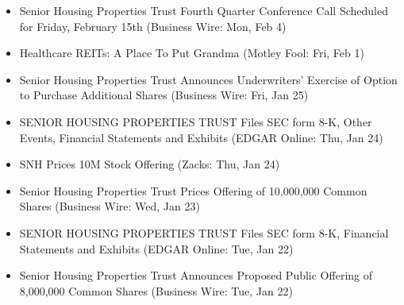 \documentclass[11pt,asymmetric]{article}
\begin{document}
\begin{itemize}
\item Senior Housing Properties Trust Fourth Quarter Conference Call Scheduled for Friday, February 15th (Business Wire: Mon, Feb 4)
\item Healthcare REITs: A Place To Put Grandma (Motley Fool: Fri, Feb 1)
\item Senior Housing Properties Trust Announces Underwriters' Exercise of Option to Purchase Additional Shares (Business Wire: Fri, Jan 25)
\item SENIOR HOUSING PROPERTIES TRUST Files SEC form 8-K, Other Events, Financial Statements and Exhibits (EDGAR Online: Thu, Jan 24)
\item SNH Prices 10M Stock Offering (Zacks: Thu, Jan 24)
\item Senior Housing Properties Trust Prices Offering of 10,000,000 Common Shares (Business Wire: Wed, Jan 23)
\item SENIOR HOUSING PROPERTIES TRUST Files SEC form 8-K, Financial Statements and Exhibits (EDGAR Online: Tue, Jan 22)
\item Senior Housing Properties Trust Announces Proposed Public Offering of 8,000,000 Common Shares (Business Wire: Tue, Jan 22)
\end{itemize}
\end{document}
